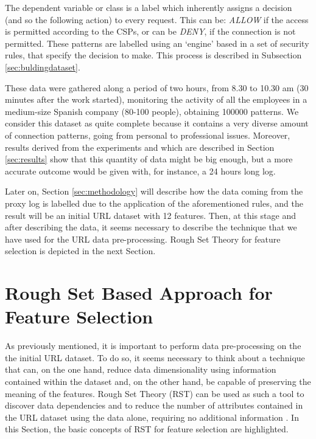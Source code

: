 \documentclass{llncs}
\begin{document}
The dependent variable or class is a label which inherently assigns a decision (and so the following action) to every request. This can be: \textit{ALLOW} if the access is permitted according to the CSPs, or can be \textit{DENY}, if the connection is not permitted. These patterns are labelled using an `engine' based in a set of security rules, that specify the decision to make. This process is described in Subsection \ref{sec:buldingdataset}.

These data were gathered along a period of two hours, from 8.30 to 10.30 am (30 minutes after the work started), monitoring the activity of all the employees in a medium-size Spanish company (80-100 people), obtaining 100000 patterns. We consider this dataset as quite complete because it contains a very diverse amount of connection patterns, going from personal to professional issues. Moreover, results derived from the experiments and which are described in Section \ref{sec:results} show that this quantity of data might be big enough, but a more accurate outcome would be given with, for instance, a 24 hours long log.

Later on, Section \ref{sec:methodology} will describe how the data coming from the proxy log is labelled due to the application of the aforementioned rules, and the result will be an initial URL dataset with 12 features. Then, at this stage and after describing the data, it seems necessary to describe the technique that we have used for the URL data pre-processing. Rough Set Theory for feature selection is depicted in the next Section.

%
\section{Rough Set Based Approach for Feature Selection}
\label{sec:featureselection}

As previously mentioned, it is important to perform data pre-processing on the the initial URL dataset.  To do so, it seems necessary to think about a technique that can, on the one hand, reduce data dimensionality using information contained within the dataset and, on the other hand, be capable of preserving the meaning of the features. Rough Set Theory (RST) \cite{pawlak2008rough} can be used as such a tool to discover data dependencies and to reduce the number of attributes contained in the URL dataset using the data alone, requiring no additional information \cite{jensen2005semantics}. In this Section, the basic concepts of RST for feature selection are highlighted.
\end{document}
